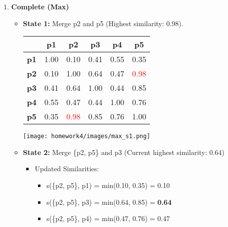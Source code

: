 \documentclass[11pt]{article}
\begin{document}
\begin{enumerate}
\begin{enumerate}
    \item \textbf{Complete (Max)}
        \begin{itemize}
            \item \textbf{State 1:} Merge p2 and p5 (Highest similarity: 0.98).
\begin{table}[H]
        \centering
        \begin{minipage}{0.7\textwidth}  %
            \centering
            \begin{minipage}{0.4\textwidth}
                \centering
                \label{tb:exp1}
                \begin{tabular}{ l| c | c | c | c | c}\hline
                           & \textbf{p1} & \textbf{p2} & \textbf{p3} & \textbf{p4} & \textbf{p5} \\ \hline
                    \bf p1 & 1.00        & 0.10        & 0.41        & 0.55        & 0.35        \\
                    \bf p2 & 0.10        & 1.00        & 0.64        & 0.47        &  \textcolor{red}{0.98}        \\
                    \bf p3 & 0.41        & 0.64        & 1.00        & 0.44        & 0.85        \\
                    \bf p4 & 0.55        & 0.47        & 0.44        & 1.00        & 0.76        \\
                    \bf p5 & 0.35        &  \textcolor{red}{0.98}        & 0.85        & 0.76        & 1.00        \\
                    \hline
                \end{tabular}
            \end{minipage}%
            \hfill
            \begin{minipage}{0.3\textwidth}
                \centering
                \texttt{[image: homework4/images/max\_s1.png]}
                \label{fig:your-image}
            \end{minipage}
        \end{minipage}
    \end{table}
    
    \item \textbf{State 2:} Merge \{p2, p5\} and p3 (Current highest similarity: 0.64)

        \begin{itemize}
        \item Updated Similarities:
        \begin{itemize}
            \item s(\{p2, p5\}, p1) = min(0.10, 0.35) = 0.10
            \item s(\{p2, p5\}, p3) = min(0.64, 0.85) = \textbf{0.64}
            \item s(\{p2, p5\}, p4) = min(0.47, 0.76) = 0.47 \\
        \end{itemize}
    \end{itemize}
    

\end{itemize}
\end{enumerate}
\end{enumerate}
\end{document}

